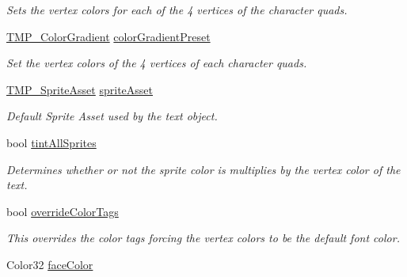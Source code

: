 \begin{DoxyCompactItemize}
\begin{DoxyCompactList}\small\item\em Sets the vertex colors for each of the 4 vertices of the character quads. \end{DoxyCompactList}\item 
\mbox{\hyperlink{class_t_m_pro_1_1_t_m_p___color_gradient}{T\+M\+P\+\_\+\+Color\+Gradient}} \mbox{\hyperlink{class_t_m_pro_1_1_t_m_p___text_a7e5dc2c3fb4201a3a18df594f95be7eb}{color\+Gradient\+Preset}}
\begin{DoxyCompactList}\small\item\em Set the vertex colors of the 4 vertices of each character quads. \end{DoxyCompactList}\item 
\mbox{\hyperlink{class_t_m_pro_1_1_t_m_p___sprite_asset}{T\+M\+P\+\_\+\+Sprite\+Asset}} \mbox{\hyperlink{class_t_m_pro_1_1_t_m_p___text_a01e29ceb3a187b51d5d87ec519c8c053}{sprite\+Asset}}
\begin{DoxyCompactList}\small\item\em Default Sprite Asset used by the text object. \end{DoxyCompactList}\item 
bool \mbox{\hyperlink{class_t_m_pro_1_1_t_m_p___text_a3af8d969cc20cf4fac2b48fc057737a1}{tint\+All\+Sprites}}
\begin{DoxyCompactList}\small\item\em Determines whether or not the sprite color is multiplies by the vertex color of the text. \end{DoxyCompactList}\item 
bool \mbox{\hyperlink{class_t_m_pro_1_1_t_m_p___text_a295f3c60b2fbbbe6be559705ef480287}{override\+Color\+Tags}}
\begin{DoxyCompactList}\small\item\em This overrides the color tags forcing the vertex colors to be the default font color. \end{DoxyCompactList}\item 
Color32 \mbox{\hyperlink{class_t_m_pro_1_1_t_m_p___text_a636390b562bc0a1f6794db74660e2291}{face\+Color}}

\end{DoxyCompactItemize}
